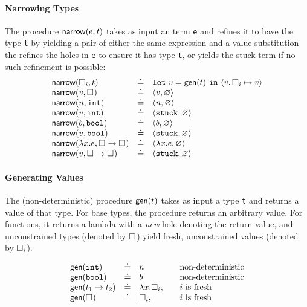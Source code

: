 \paragraph{Narrowing Types} The procedure $\mathsf{narrow}(e, t)$ takes as
input an term \texttt{e} and refines it to have the type \texttt{t}
by yielding a pair of either the same expression and a value substitution
the refines the holes in \texttt{e} to ensure it has type \texttt{t},
or yields the stuck term if no such refinement is possible:
%
$$
\begin{array}{lcl}
\mathsf{narrow}(\square_{i}, t) & \doteq & \mathtt{let}\ v = \mathsf{gen}(t)\ \mathtt{in}\ \langle v, \square_{i} \mapsto v \rangle \\
\mathsf{narrow}(v, \square_{})  & \doteq & \langle v, \varnothing \rangle \\
\mathsf{narrow}(n, \mathtt{int})     & \doteq & \langle n, \varnothing \rangle \\
\mathsf{narrow}(v, \mathtt{int})     & \doteq & \langle \mathtt{stuck}, \varnothing \rangle \\
\mathsf{narrow}(b, \mathtt{bool})    & \doteq & \langle b, \varnothing \rangle \\
\mathsf{narrow}(v, \mathtt{bool})    & \doteq & \langle \mathtt{stuck}, \varnothing \rangle \\
\mathsf{narrow}(\lambda x. e, {\square_{}} \rightarrow \square_{}) & \doteq & \langle \lambda x. e, \varnothing \rangle \\
\mathsf{narrow}(v, {\square_{}} \rightarrow \square_{}) & \doteq & \langle \mathtt{stuck}, \varnothing \rangle \\
\end{array}
$$

\paragraph{Generating Values} The (non-deterministic) procedure $\mathsf{gen}(t)$
takes as input a type \texttt{t} and returns a value of that type. For base
types, the procedure returns an arbitrary value. For functions, it returns
a lambda with a \emph{new} hole denoting the return value, and unconstrained
types (denoted by $\square_{}$) yield fresh, unconstrained values
(denoted by $\square_{i}$).

$$
\begin{array}{lcll}
\mathsf{gen}(\mathtt{int})   & \doteq  & n & \quad \text{non-deterministic} \\
\mathsf{gen}(\mathtt{bool})  & \doteq  & b & \quad \text{non-deterministic} \\
\mathsf{gen}({t_1} \rightarrow t_2)   & \doteq & \lambda x. \square_{i}, & \quad \text{$i$ is fresh} \\
\mathsf{gen}(\square_{}) & \doteq & \square_{i}, & \quad \text{$i$ is fresh} \\
\end{array}
$$

